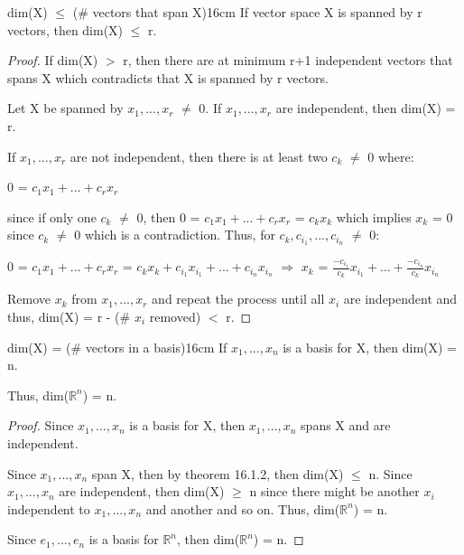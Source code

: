     \vspace{0.5cm}



    \begin{wtheorem}{dim(X) $\leq$ (\# vectors that span X)}{16cm}
        If vector space X is spanned by r vectors, then dim(X) $\leq$ r.
    \end{wtheorem}

    \begin{proof}
        If dim(X) $>$ r, then there are at minimum r+1 independent vectors
        that spans X which contradicts that X is spanned by r vectors.

        Let X be spanned by $x_1,...,x_r$ $\not =$ 0.
        If $x_1,...,x_r$ are independent, then dim(X) = r.

        If $x_1,...,x_r$ are not independent, then there is at least two
        $c_k$ $\not =$ 0 where:

        \hspace{0.5cm}
        0 = $c_1x_1 + ... + c_rx_r$

        since if only one $c_k$ $\not =$ 0, then 
        0 = $c_1x_1 + ... + c_rx_r$ = $c_kx_k$ which implies $x_k$ = 0
        since $c_k$ $\not =$ 0 which is a contradiction.
        Thus, for $c_k,c_{i_1},...,c_{i_n}$ $\not =$ 0:

        \hspace{0.5cm}
        0 = $c_1x_1 + ... + c_rx_r$
        = $c_kx_k + c_{i_1}x_{i_1} + ... + c_{i_n}x_{i_n}$
        \hspace{0.7cm}
        $\Rightarrow$
        \hspace{0.7cm}
        $x_k$ = $\frac{-c_{i_1}}{c_k}x_{i_1} + ... + \frac{-c_{i_n}}{c_k}x_{i_n}$

        Remove $x_k$ from $x_1,...,x_r$ and repeat the process
        until all $x_i$ are independent and thus,
        dim(X) = r - (\# $x_i$ removed) $<$ r.
    \end{proof}

    \newpage



    \begin{corollary}{dim(X) = (\# vectors in a basis)}{16cm}
        If $x_1,...,x_n$ is a basis for X, then dim(X) = n.
        
        Thus, dim($\mathbb{R}^n$) = n.
    \end{corollary}

    \begin{proof}
        Since $x_1,...,x_n$ is a basis for X, then
        $x_1,...,x_n$ spans X and are independent.

        Since $x_1,...,x_n$ span X, then by {\color{red} theorem 16.1.2},
        then dim(X) $\leq$ n.
        Since $x_1,...,x_n$ are independent, then dim(X) $\geq$ n
        since there might be another $x_i$ independent to $x_1,...,x_n$
        and another and so on.
        Thus, dim($\mathbb{R}^n$) = n.

        Since $e_1,...,e_n$ is a basis for $\mathbb{R}^n$, then
        dim($\mathbb{R}^n$) = n.
    \end{proof}

